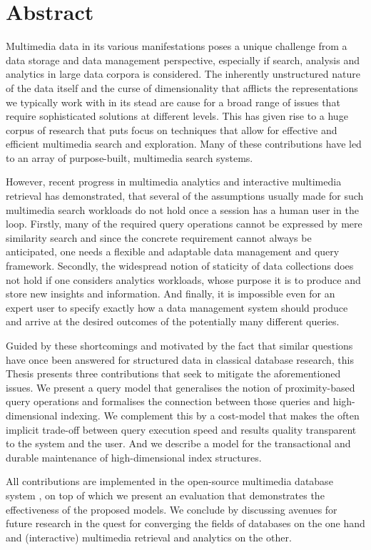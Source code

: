 
\chapter{Abstract}

Multimedia data in its various manifestations poses a unique challenge from a data storage and data management perspective, especially if search, analysis and analytics in large data corpora is considered. The inherently unstructured nature of the data itself and the curse of dimensionality that afflicts the representations we typically work with in its stead are cause for a broad range of issues that require sophisticated solutions at different levels. This has given rise to a huge corpus of research that puts focus on techniques that allow for effective and efficient multimedia search and exploration. Many of these contributions have led to an array of purpose-built, multimedia search systems.

However, recent progress in multimedia analytics and interactive multimedia retrieval has demonstrated, that several of the assumptions usually made for such multimedia search workloads do not hold once a session has a human user in the loop. Firstly, many of the required query operations cannot be expressed by mere similarity search and since the concrete requirement cannot always be anticipated, one needs a flexible and adaptable data management and query framework. Secondly, the widespread notion of staticity of data collections does not hold if one considers analytics workloads, whose purpose it is to produce and store new insights and information. And finally, it is impossible even for an expert user to specify exactly how a data management system should produce and arrive at the desired outcomes of the potentially many different queries.

Guided by these shortcomings and motivated by the fact that similar questions have once been answered for structured data in classical database research, this Thesis presents three contributions that seek to mitigate the aforementioned issues. We present a query model that generalises the notion of proximity-based query operations and formalises the connection between those queries and high-dimensional indexing. We complement this by a cost-model that makes the often implicit trade-off between query execution speed and results quality transparent to the system and the user. And we describe a model for the transactional and durable maintenance of high-dimensional index structures.

All contributions are implemented in the open-source multimedia database system \cottontail{}, on top of which we present an evaluation that demonstrates the effectiveness of the proposed models. We conclude by discussing avenues for future research in the quest for converging the fields of databases on the one hand and (interactive) multimedia retrieval and analytics on the other.